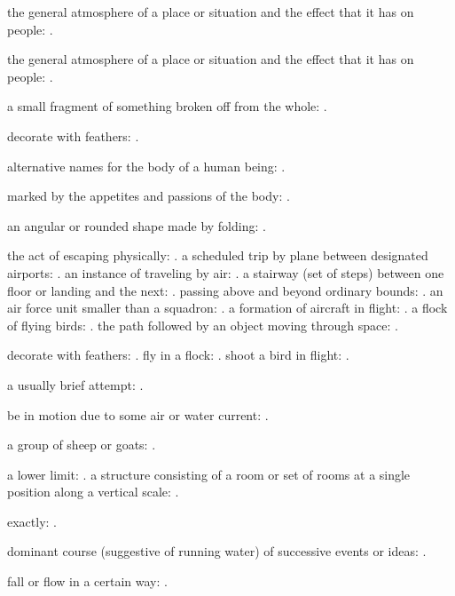   the general atmosphere of a place or situation and the effect that it has on people: .

  the general atmosphere of a place or situation and the effect that it has on people: .

  a small fragment of something broken off from the whole: .

  decorate with feathers: .

  alternative names for the body of a human being: .

  marked by the appetites and passions of the body: .

  an angular or rounded shape made by folding: .

  the act of escaping physically: . a scheduled trip by plane between designated airports: . an instance of traveling by air: . a stairway (set of steps) between one floor or landing and the next: . passing above and beyond ordinary bounds: . an air force unit smaller than a squadron: . a formation of aircraft in flight: . a flock of flying birds: . the path followed by an object moving through space: .

  decorate with feathers: . fly in a flock: . shoot a bird in flight: .

  a usually brief attempt: .

  be in motion due to some air or water current: .

  a group of sheep or goats: .

  a lower limit: . a structure consisting of a room or set of rooms at a single position along a vertical scale: .

  exactly: .

  dominant course (suggestive of running water) of successive events or ideas: .

  fall or flow in a certain way: .

